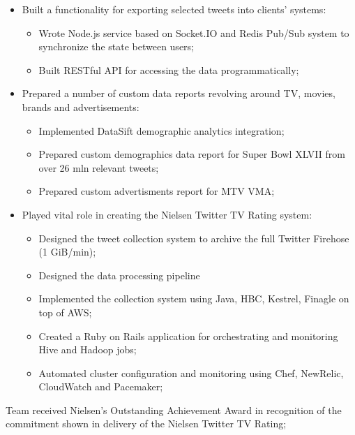 \documentclass[11pt,a4paper,sans]{moderncv}        %
\begin{document}
{\begin{itemize}
\begin{itemize}
    \item Built a functionality for exporting selected tweets into clients' systems:
      \begin{itemize}
      \item Wrote Node.js service based on Socket.IO and Redis Pub/Sub system to synchronize the state between users;
      \item Built RESTful API for accessing the data programmatically;
      \end{itemize}
    \item Prepared a number of custom data reports revolving around TV, movies, brands and advertisements:
      \begin{itemize}
      \item Implemented DataSift demographic analytics integration;
      \item Prepared custom demographics data report for Super Bowl XLVII from over 26 mln relevant tweets;
      \item Prepared custom advertisments report for MTV VMA;
      \end{itemize}
    \item Played vital role in creating the Nielsen Twitter TV Rating system:
      \begin{itemize}
      \item Designed the tweet collection system to archive the full Twitter Firehose (1 GiB/min);
      \item Designed the data processing pipeline
      \item Implemented the collection system using Java, HBC, Kestrel, Finagle on top of AWS;
      \item Created a Ruby on Rails application for orchestrating and monitoring Hive and Hadoop jobs;
      \item Automated cluster configuration and monitoring using Chef, NewRelic, CloudWatch and Pacemaker;
      \end{itemize}
    \end{itemize}
  \end{itemize}
  Team received Nielsen's Outstanding Achievement Award in recognition of the commitment shown in delivery of the Nielsen Twitter TV Rating;\newline}
\end{document}
